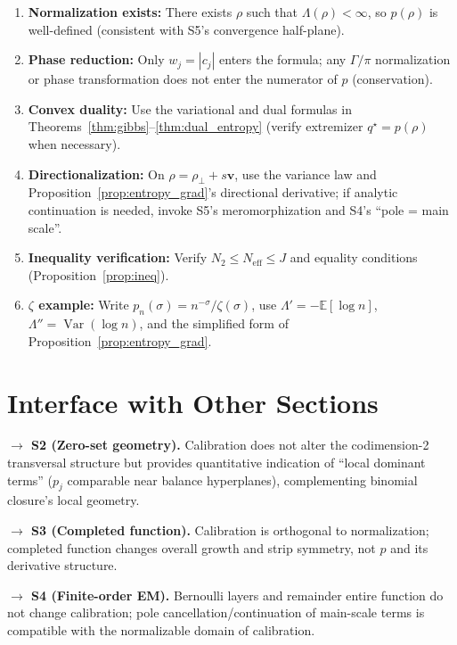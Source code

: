 \documentclass[11pt,a4paper]{article}
\theoremstyle{remark}
\DeclareMathOperator{\Var}{Var}
\begin{document}
\begin{enumerate}
\item \textbf{Normalization exists:} There exists $\rho$ such that $\Lambda(\rho)<\infty$, so $p(\rho)$ is well-defined (consistent with S5's convergence half-plane).

\item \textbf{Phase reduction:} Only $w_j=|c_j|$ enters the formula; any $\Gamma/\pi$ normalization or phase transformation does not enter the numerator of $p$ (conservation).

\item \textbf{Convex duality:} Use the variational and dual formulas in Theorems~\ref{thm:gibbs}--\ref{thm:dual_entropy} (verify extremizer $q^\star=p(\rho)$ when necessary).

\item \textbf{Directionalization:} On $\rho=\rho_\perp+s\mathbf{v}$, use the variance law and Proposition~\ref{prop:entropy_grad}'s directional derivative; if analytic continuation is needed, invoke S5's meromorphization and S4's ``pole = main scale''.

\item \textbf{Inequality verification:} Verify $N_2\le N_{\mathrm{eff}}\le J$ and equality conditions (Proposition~\ref{prop:ineq}).

\item \textbf{$\zeta$ example:} Write $p_n(\sigma)=n^{-\sigma}/\zeta(\sigma)$, use $\Lambda'=-\mathbb{E}[\log n]$, $\Lambda''=\Var(\log n)$, and the simplified form of Proposition~\ref{prop:entropy_grad}.
\end{enumerate}

\section{Interface with Other Sections}

\textbf{$\to$ S2 (Zero-set geometry).} Calibration does not alter the codimension-2 transversal structure but provides quantitative indication of ``local dominant terms'' ($p_j$ comparable near balance hyperplanes), complementing binomial closure's local geometry.

\textbf{$\to$ S3 (Completed function).} Calibration is orthogonal to normalization; completed function changes overall growth and strip symmetry, not $p$ and its derivative structure.

\textbf{$\to$ S4 (Finite-order EM).} Bernoulli layers and remainder entire function do not change calibration; pole cancellation/continuation of main-scale terms is compatible with the normalizable domain of calibration.
\end{document}
